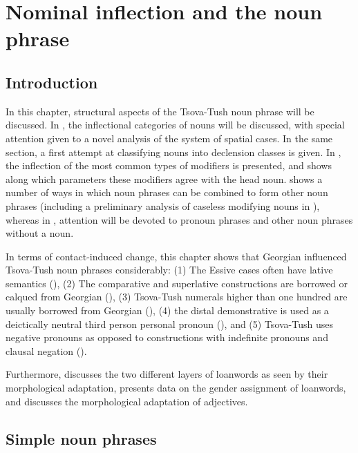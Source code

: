 \chapter{Nominal inflection and the noun phrase}\label{nounphrase}

\section{Introduction}

In this chapter, structural aspects of the Tsova-Tush noun phrase will be discussed. In , the inflectional categories of nouns will be discussed, with special attention given to a novel analysis of the system of spatial cases. In the same section, a first attempt at classifying nouns into declension classes is given. In , the inflection of the most common types of modifiers is presented, and  shows along which parameters these modifiers agree with the head noun.  shows a number of ways in which noun phrases can be combined to form other noun phrases (including a preliminary analysis of caseless modifying nouns in ), whereas in , attention will be devoted to pronoun phrases and other noun phrases without a noun.


In terms of contact-induced change, this chapter shows that Georgian influenced Tsova-Tush noun phrases considerably: (1) The Essive cases often have lative semantics (), (2) The comparative and superlative constructions are borrowed or calqued from Georgian (), (3) Tsova-Tush numerals higher than one hundred are usually borrowed from Georgian (), (4) the distal demonstrative is used as a deictically neutral third person personal pronoun (), and (5) Tsova-Tush uses negative pronouns as opposed to constructions with indefinite pronouns and clausal negation ().


Furthermore,  discusses the two different layers of loanwords as seen by their morphological adaptation,  presents data on the gender assignment of loanwords, and  discusses the morphological adaptation of adjectives.





\section{Simple noun phrases} \label{simplenp}

